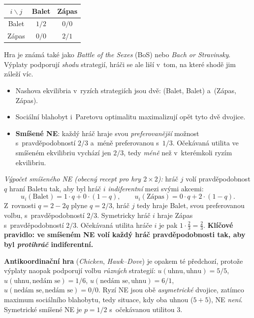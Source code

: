 \documentclass[11pt,a4paper]{article}
\theoremstyle{definition}
\begin{document}
\begin{defbox}
\begin{center}
\begin{tabular}{c|cc}
$i \backslash j$ & Balet & Zápas \\
\hline
Balet & $1/2$ & $0/0$ \\
Zápas & $0/0$ & $2/1$ \\
\end{tabular}
\end{center}
Hra je známá také jako \emph{Battle of the Sexes} (BoS) nebo \emph{Bach or Stravinsky}. Výplaty
podporují \emph{shodu} strategií, hráči se ale liší v~tom, na které shodě jim záleží víc.
\begin{itemize}
\item Nashova ekvilibria v~ryzích strategiích jsou dvě: (Balet, Balet) a~(Zápas, Zápas).
\item Sociální blahobyt i~Paretovu optimalitu maximalizují opět tyto dvě dvojice.
\item \textbf{Smíšené NE}: každý hráč hraje svou \emph{preferovanější} možnost
  s~pravděpodobností $2/3$ a~méně preferovanou s~$1/3$. Očekávaná utilita ve smíšeném
  ekvilibriu vychází jen $2/3$, tedy \emph{méně} než v~kterémkoli ryzím ekvilibriu.
\end{itemize}

\emph{Výpočet smíšeného NE (obecný recept pro hry $2\times2$):} hráč $j$ volí pravděpodobnost
$q$ hraní Baletu tak, aby byl hráč $i$ \emph{indiferentní} mezi svými akcemi:
\[
u_i(\text{Balet}) = 1\cdot q + 0\cdot(1-q), \qquad u_i(\text{Zápas}) = 0\cdot q + 2\cdot(1-q).
\]
Z~rovnosti $q = 2 - 2q$ plyne $q = 2/3$, hráč $j$ tedy hraje Balet, svou preferovanou volbu,
s~pravděpodobností $2/3$. Symetricky hráč $i$ hraje Zápas s~pravděpodobností $2/3$. Očekávaná
utilita hráče $i$ je pak $1 \cdot \frac{2}{3} = \frac{2}{3}$.
\textbf{Klíčové pravidlo: ve smíšeném NE volí každý hráč pravděpodobnosti tak, aby byl
\emph{protihráč} indiferentní.}
\end{defbox}

\noindent\textbf{Antikoordinační hra} (\emph{Chicken}, \emph{Hawk--Dove}) je opakem té
předchozí, protože výplaty naopak podporují volbu \emph{různých} strategií:
$u(\text{uhnu},\text{uhnu}) = 5/5$, $u(\text{uhnu},\text{nedám se}) = 1/6$,
$u(\text{nedám se},\text{uhnu}) = 6/1$, $u(\text{nedám se},\text{nedám se}) = 0/0$.
Ryzí NE jsou obě \emph{asymetrické} dvojice, zatímco maximum sociálního blahobytu, tedy situace,
kdy oba uhnou ($5+5$), NE \emph{není}. Symetrické smíšené NE je $p = 1/2$ s~očekávanou utilitou
$3$.
\end{document}
